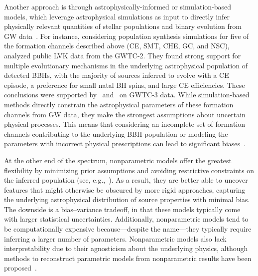 \documentclass[twocolumn, twocolappendix]{aastex631}
\begin{document}
Another approach is through astrophysically-informed or simulation-based models, which leverage astrophysical simulations as input to directly infer physically relevant quantities of stellar populations and binary evolution from \ac{GW} data~\citep{Barrett:2016edh, Taylor:2018iat, Wong:2020ise, Mould:2022ccw, Riley:2023jep, Leyde:2023iof, Mastrogiovanni:2022ykr, Zevin:2020gbd, Cheng:2023ddt, Colloms:2025hib, Neijssel:2019irh, Bouffanais:2020qds, Plunkett:2025mjr}. For instance, considering population synthesis simulations for five of the formation channels described above (\ac{CE}, \ac{SMT}, \ac{CHE}, \ac{GC}, and \ac{NSC}), \citet{Zevin:2020gbd} analyzed public \acs{LVK} data from the \ac{GWTC-2}. They found strong support for multiple evolutionary mechanisms in the underlying astrophysical population of detected \acp{BBH}, with the majority of sources inferred to evolve with a \ac{CE} episode, a preference for small natal \ac{BH} spins, and large  \ac{CE} efficiencies. These conclusions were supported by~\citet{Cheng:2023ddt} and~\citet{Colloms:2025hib} on \acs{GWTC-3} data. While simulation-based methods directly constrain the astrophysical parameters of these formation channels from \ac{GW} data, they make the strongest assumptions about uncertain physical processes. This means that considering an incomplete set of formation channels contributing to the underlying \ac{BBH} population or modeling the parameters with incorrect physical prescriptions can lead to significant biases~\citep{Cheng:2023ddt}. 

At the other end of the spectrum, nonparametric models offer the greatest flexibility by minimizing prior assumptions and avoiding restrictive constraints on the inferred population (see, e.g.,~\citet{Heinzel:2024jlc, Edelman:2022ydv, Godfrey:2023oxb, Golomb:2022bon, Heinzel:2023hlb, Tiwari:2020vym, Rinaldi:2021bhm, Callister:2023tgi, Li:2021ukd, Ray:2023upk, Farah:2024xub, Toubiana:2023egi,Sadiq:2023zee,Sadiq:2025aog,Sadiq:2025vly,Mandel:2016prl}). 
As a result, they are better able to uncover features that might otherwise be obscured by more rigid approaches, capturing the underlying astrophysical distribution of source properties with minimal bias. The downside is a bias--variance tradeoff, in that these models typically come with larger statistical uncertainties. Additionally, nonparametric models tend to be computationally expensive because---despite the name---they typically require inferring a larger number of parameters. Nonparametric models also lack interpretability due to their agnosticism about the underlying physics, although methods to reconstruct parametric models from nonparametric results have been proposed~\citep{Fabbri:2025faf,Rinaldi:2025evs}. 
\end{document}
